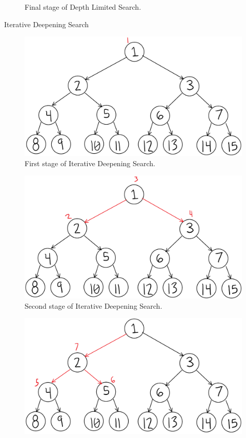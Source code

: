 \documentclass[11pt]{article}
\newenvironment{problem}[2][Problem]{\begin{trivlist}
\item[\hskip \labelsep {\bfseries #1}\hskip \labelsep {\bfseries #2.}]}{\end{trivlist}}
\begin{document}
\begin{problem}{10}
\begin{enumerate}
\begin{figure}
				\caption{Final stage of Depth Limited Search.}
				\label{fig.bfs}
			\end{figure}
			\newline
			\begin{large}Iterative Deepening Search\end{large}
			\begin{figure}
				\includegraphics[scale=0.5]{ID_1.PNG}
				\caption{First stage of Iterative Deepening Search.}
				\label{fig.bfs}
			\end{figure}
			\begin{figure}
				\includegraphics[scale=0.5]{ID_2.PNG}
				\caption{Second stage of Iterative Deepening Search.}
				\label{fig.bfs}
			\end{figure}
			\begin{figure}
				\includegraphics[scale=0.5]{ID_3.PNG}

\end{figure}
\end{enumerate}
\end{problem}
\end{document}
